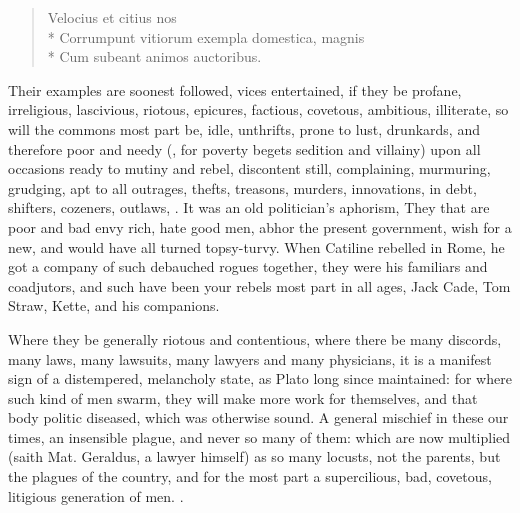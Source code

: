 \begin{latin}
\begin{verse}
Velocius et citius nos\\*
Corrumpunt vitiorum exempla domestica, magnis\\*
Cum subeant animos auctoribus.
\end{verse}
\end{latin}
\translationrule
{}

Their examples are soonest followed, vices entertained, if they be
profane, irreligious, lascivious, riotous, epicures, factious,
covetous, ambitious, illiterate, so will the commons most part be,
idle, unthrifts, prone to lust, drunkards, and therefore poor and needy
(, for poverty begets sedition and
villainy) upon all occasions ready to mutiny and rebel, discontent
still, complaining, murmuring, grudging, apt to all outrages, thefts,
treasons, murders, innovations, in debt, shifters, cozeners, outlaws,
. It was an old politician's aphorism,
They that are poor and bad envy rich, hate good men, abhor the present
government, wish for a new, and would have all turned topsy-turvy. When
Catiline rebelled in Rome, he got a company of such debauched rogues
together, they were his familiars and coadjutors, and such have been
your rebels most part in all ages, Jack Cade, Tom Straw, Kette, and his
companions.

Where they be generally riotous and contentious, where there be many
discords, many laws, many lawsuits, many lawyers and many physicians,
it is a manifest sign of a distempered, melancholy state, as Plato
long since maintained: for where such kind of men swarm, they will make
more work for themselves, and that body politic diseased, which was
otherwise sound. A general mischief in these our times, an insensible
plague, and never so many of them: which are now multiplied (saith Mat.
Geraldus, a lawyer himself) as so many locusts, not the parents,
but the plagues of the country, and for the most part a supercilious,
bad, covetous, litigious generation of men.  \etc{}.

